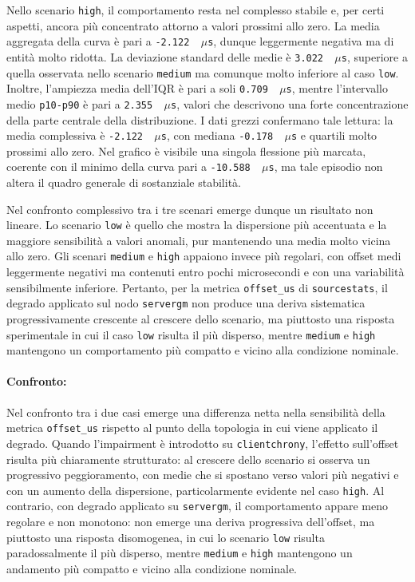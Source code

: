 Nello scenario \texttt{high}, il comportamento resta nel complesso stabile e, per
certi aspetti, ancora più concentrato attorno a valori prossimi allo zero. La media
aggregata della curva è pari a \texttt{-2.122 \,$\mu$s}, dunque leggermente negativa
ma di entità molto ridotta. La deviazione standard delle medie è \texttt{3.022
\,$\mu$s}, superiore a quella osservata nello scenario \texttt{medium} ma comunque
molto inferiore al caso \texttt{low}. Inoltre, l'ampiezza media dell'IQR è pari
a soli \texttt{0.709 \,$\mu$s}, mentre l'intervallo medio \texttt{p10-p90} è pari
a \texttt{2.355 \,$\mu$s}, valori che descrivono una forte concentrazione della parte
centrale della distribuzione. I dati grezzi confermano tale lettura: la media complessiva
è \texttt{-2.122 \,$\mu$s}, con mediana \texttt{-0.178 \,$\mu$s} e quartili
molto prossimi allo zero. Nel grafico è visibile una singola flessione più marcata,
coerente con il minimo della curva pari a \texttt{-10.588 \,$\mu$s}, ma tale
episodio non altera il quadro generale di sostanziale stabilità.

Nel confronto complessivo tra i tre scenari emerge dunque un risultato non
lineare. Lo scenario \texttt{low} è quello che mostra la dispersione più
accentuata e la maggiore sensibilità a valori anomali, pur mantenendo una media molto
vicina allo zero. Gli scenari \texttt{medium} e \texttt{high} appaiono invece
più regolari, con offset medi leggermente negativi ma contenuti entro pochi microsecondi
e con una variabilità sensibilmente inferiore. Pertanto, per la metrica \texttt{offset\_us}
di \texttt{sourcestats}, il degrado applicato sul nodo \texttt{servergm} non produce
una deriva sistematica progressivamente crescente al crescere dello scenario, ma
piuttosto una risposta sperimentale in cui il caso \texttt{low} risulta il più disperso,
mentre \texttt{medium} e \texttt{high} mantengono un comportamento più compatto
e vicino alla condizione nominale.

\paragraph*{Confronto:}
Nel confronto tra i due casi emerge una differenza netta nella sensibilità della metrica
\texttt{offset\_us} rispetto al punto della topologia in cui viene applicato il
degrado. Quando l'impairment è introdotto su \texttt{clientchrony}, l'effetto sull'offset
risulta più chiaramente strutturato: al crescere dello scenario si osserva un
progressivo peggioramento, con medie che si spostano verso valori più negativi e con
un aumento della dispersione, particolarmente evidente nel caso \texttt{high}.
Al contrario, con degrado applicato su \texttt{servergm}, il comportamento appare
meno regolare e non monotono: non emerge una deriva progressiva dell'offset, ma piuttosto
una risposta disomogenea, in cui lo scenario \texttt{low} risulta paradossalmente
il più disperso, mentre \texttt{medium} e \texttt{high} mantengono un andamento
più compatto e vicino alla condizione nominale.

